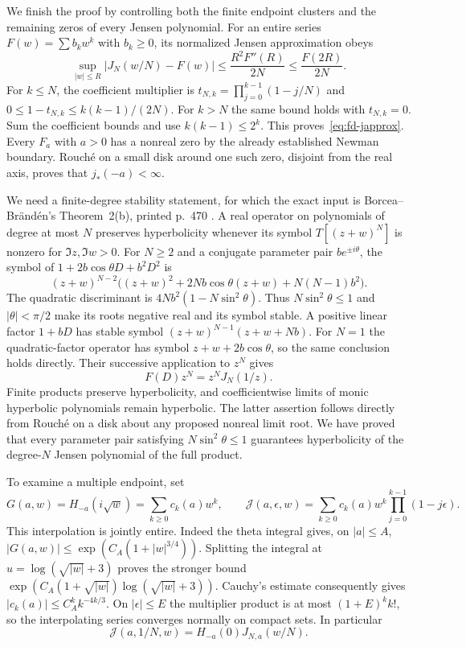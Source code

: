 We finish the proof by controlling both the finite endpoint clusters and the remaining zeros of every Jensen polynomial.
For an entire series $F(w)=\sum b_kw^k$ with $b_k\ge0$, its normalized
Jensen approximation obeys
\begin{equation}\label{eq:fd-japprox}
 \sup_{|w|\le R}|J_N(w/N)-F(w)|
 \le\frac{R^2F''(R)}{2N}\le\frac{F(2R)}{2N}.
\end{equation}
For $k\le N$, the coefficient multiplier is
$t_{N,k}=\prod_{j=0}^{k-1}(1-j/N)$ and
$0\le1-t_{N,k}\le k(k-1)/(2N)$.
For $k>N$ the same bound holds with $t_{N,k}=0$.
Sum the coefficient bounds and use $k(k-1)\le2^k$.
This proves~\eqref{eq:fd-japprox}.
Every $F_a$ with $a>0$ has a nonreal zero by the already established
Newman boundary.  Rouch\'e on a small disk around one such zero,
disjoint from the real axis, proves that $j_*(-a)<\infty$.

We need a finite-degree stability statement, for which the exact
input is Borcea--Br\"and\'en's Theorem~2(b), printed p.~470
\cite{BB2009}.  A real operator on polynomials of degree at most $N$
preserves hyperbolicity whenever its symbol $T[(z+w)^N]$ is nonzero
for $\Im z,\Im w>0$.
For $N\ge2$ and a conjugate parameter pair $be^{\pm i\theta}$, the symbol of
$1+2b\cos\theta D+b^2D^2$ is
\[
 (z+w)^{N-2}\big((z+w)^2+2Nb\cos\theta(z+w)+N(N-1)b^2\big).
\]
The quadratic discriminant is $4Nb^2(1-N\sin^2\theta)$.
Thus $N\sin^2\theta\le1$ and $|\theta|<\pi/2$ make its roots
negative real and its symbol stable.  A positive linear factor
$1+bD$ has stable symbol $(z+w)^{N-1}(z+w+Nb)$.
For $N=1$ the quadratic-factor operator has symbol
$z+w+2b\cos\theta$, so the same conclusion holds directly.
Their successive application to $z^N$ gives
\begin{equation}\label{eq:fd-operatorj}
 F(D)z^N=z^N J_N(1/z).
\end{equation}
Finite products preserve hyperbolicity, and coefficientwise limits of
monic hyperbolic polynomials remain hyperbolic.  The latter assertion
follows directly from Rouch\'e on a disk about any proposed nonreal
limit root.  We have proved that every parameter pair satisfying
$N\sin^2\theta\le1$ guarantees hyperbolicity of the degree-$N$
Jensen polynomial of the full product.

To examine a multiple endpoint, set
\[
 G(a,w)=H_{-a}(i\sqrt w)=\sum_{k\ge0}c_k(a)w^k,
 \qquad
 \mathcal J(a,\epsilon,w)=\sum_{k\ge0}c_k(a)w^k
                  \prod_{j=0}^{k-1}(1-j\epsilon).
\]
This interpolation is jointly entire.  Indeed the theta integral gives,
on $|a|\le A$,
$|G(a,w)|\le\exp(C_A(1+|w|^{3/4}))$.
Splitting the integral at $u=\log(\sqrt{|w|}+3)$ proves the stronger
bound $\exp(C_A(1+\sqrt{|w|})\log(\sqrt{|w|}+3))$.
Cauchy's estimate consequently gives
$|c_k(a)|\le C_A^k k^{-4k/3}$.
On $|\epsilon|\le E$ the multiplier product is at most
$(1+E)^k k!$, so the interpolating series converges normally on
compact sets.  In particular
\begin{equation}\label{eq:fd-jinterp}
 \mathcal J(a,1/N,w)=H_{-a}(0)J_{N,a}(w/N).
\end{equation}

